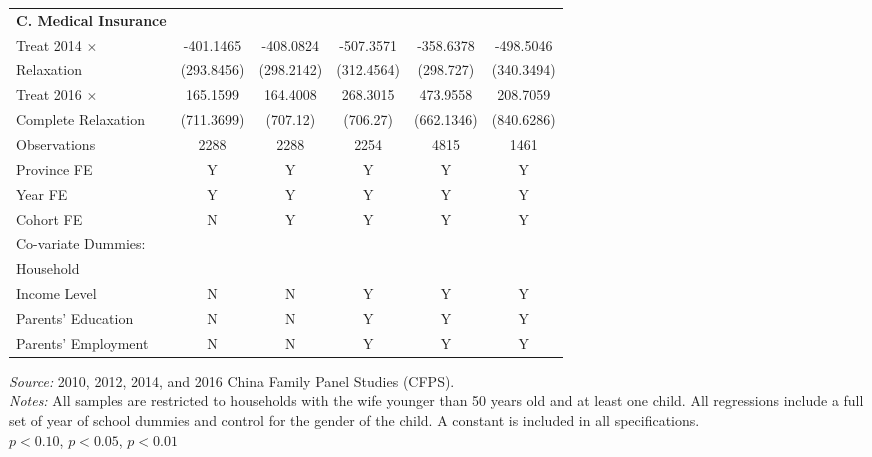 \documentclass[12pt]{extarticle}
\begin{document}
\begin{table}
\begin{threeparttable}
\begin{tabular}{l*{5}{c}}
\textbf{C. Medical Insurance} \\
Treat 2014 $\times$ &   -401.1465   &   -408.0824   &   -507.3571   &   -358.6378   &   -498.5046   \\
\quad 2014 Relaxation     &  (293.8456)   &  (298.2142)   &  (312.4564)   &   (298.727)   &  (340.3494)   \\
Treat 2016 $\times$ &    165.1599   &    164.4008   &    268.3015   &    473.9558   &    208.7059   \\
\quad Complete Relaxation &  (711.3699)   &    (707.12)   &    (706.27)   &  (662.1346)   &  (840.6286)   \\
Observations        &        2288   &        2288   &        2254   &        4815   &        1461   \\
\hline
Province FE &  Y &  Y & Y & Y & Y \\
Year FE &  Y &  Y & Y & Y & Y \\
Cohort FE & N & Y & Y & Y & Y \\
Co-variate Dummies: \\
\quad Household \\
\qquad Income Level & N & N & Y & Y & Y \\
\quad Parents' Education &  N &  N & Y & Y & Y \\
\quad Parents' Employment &  N &  N & Y & Y & Y \\
\hline\hline
\end{tabular}
\begin{tablenotes}
\footnotesize \textit{Source:} 2010, 2012, 2014, and 2016 China Family Panel Studies (CFPS). \\
\textit{Notes:} All samples are restricted to households with the wife younger than 50 years old and at least one child. All regressions include a full set of year of school dummies and control for the gender of the child. A constant is included in all specifications. \\
\quad \sym{*} \(p<0.10\), \sym{**} \(p<0.05\), \sym{***} \(p<0.01\)
\end{tablenotes}
\end{threeparttable}
\end{table}
\end{document}
